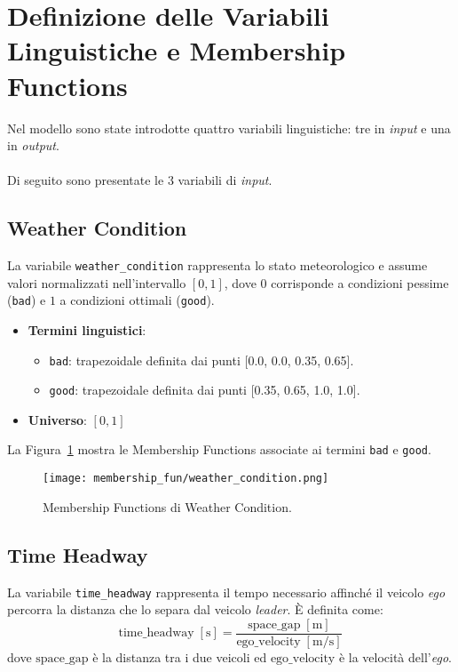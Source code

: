 \section{Definizione delle Variabili Linguistiche e Membership Functions}

Nel modello sono state introdotte quattro variabili linguistiche: tre in \emph{input} e una in \emph{output}.
\\\\
Di seguito sono presentate le 3 variabili di \emph{input}.

\subsection{Weather Condition}
La variabile \texttt{weather\_condition} rappresenta lo stato meteorologico e assume valori normalizzati nell'intervallo \([0,1]\), 
dove \(0\) corrisponde a condizioni pessime (\texttt{bad}) e \(1\) a condizioni ottimali (\texttt{good}).  

\begin{itemize}
  \item \textbf{Termini linguistici}:
    \begin{itemize}
      \item \texttt{bad}: trapezoidale definita dai punti [0.0, 0.0, 0.35, 0.65].
      \item \texttt{good}: trapezoidale definita dai punti  [0.35, 0.65, 1.0, 1.0].
    \end{itemize}
  \item \textbf{Universo}: \([0,1]\)
\end{itemize}

\noindent La Figura~\ref{Fig:mf_weather_condition} mostra le Membership Functions associate ai termini \texttt{bad} e \texttt{good}.

\begin{figure}[H]
    \centering
    \texttt{[image: membership\_fun/weather\_condition.png]}
    \caption{Membership Functions di Weather Condition.}
    \label{Fig:mf_weather_condition}
\end{figure}

\subsection{Time Headway}
La variabile \texttt{time\_headway} rappresenta il tempo necessario affinché il veicolo \emph{ego} 
percorra la distanza che lo separa dal veicolo \emph{leader}. È definita come:
\[
\text{time\_headway} \; [\mathrm{s}]
= \frac{\text{space\_gap}\;[\mathrm{m}]}{\text{ego\_velocity}\;[\mathrm{m}/\mathrm{s}]}
\]
dove \(\text{space\_gap}\) è la distanza tra i due veicoli ed \emph{\(\text{ego\_velocity}\)} è la velocità dell'\emph{ego}. 
